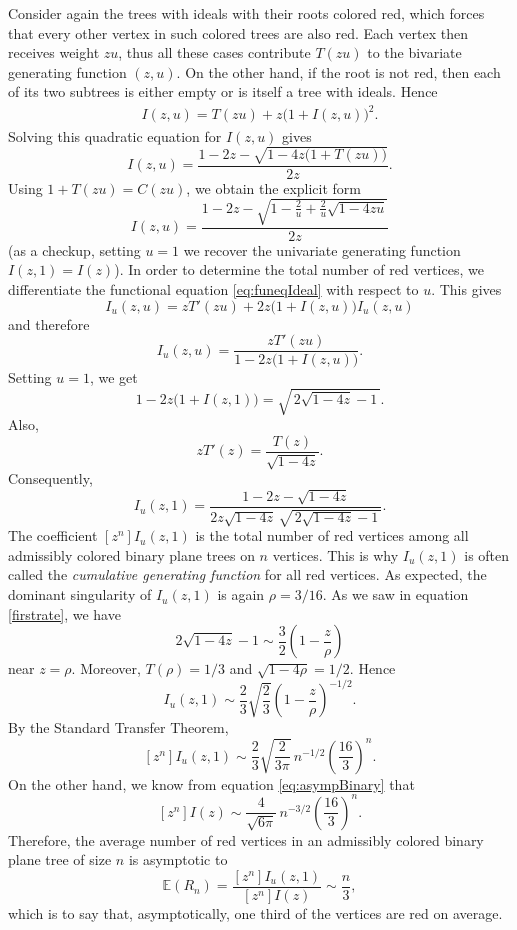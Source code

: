 \documentclass[11pt, onesided]{amsart}
\theoremstyle{remark}
\begin{document}
Consider again the trees with ideals with their roots colored red, which forces that every other vertex in such colored trees are also red. Each vertex then receives weight $zu$, thus all these cases contribute $T(zu)$ to the bivariate generating function $(z,u)$. On the other hand, if the root is not red, then each of its two subtrees is either empty or is itself a tree with ideals. 
%
Hence
\begin{align}
\label{eq:funeqIdeal}
I(z,u)=T(zu)+z\big(1+I(z,u)\big)^2.
\end{align}
Solving this quadratic equation for $I(z,u)$ gives \[ I(z,u) = \frac{ 1-2z-\sqrt{1-4z\big(1+T(zu)\big)} }{2z}. \] Using
$1+T(zu) = C(zu)$,
we obtain the explicit form
\[  I(z,u) = \frac{ 1-2z- \sqrt{ 1-\frac{2}{u}+\frac{2}{u}\sqrt{1-4zu} } }{2z}  \]
%
(as a checkup, setting $u=1$ we recover the univariate generating function
$I(z,1) =I(z)$).
In order to determine the total number of red vertices, we differentiate the functional equation \eqref{eq:funeqIdeal} with respect to $u$. This gives
\[
I_u(z,u) = zT'(zu) + 2z\big(1+I(z,u)\big)I_u(z,u)
\]
and therefore
 \[
 I_u(z,u) = \frac{zT'(zu)} {1-2z\big(1+I(z,u)\big)}.
 \]
 Setting $u=1$, we get \[ 1-2z\big(1+I(z,1)\big) = \sqrt{\,2\sqrt{1-4z}-1\,}.
 \] Also, \[ zT'(z) = \frac{T(z)}{\sqrt{1-4z}}. \] Consequently,
 \[
 	{ I_u(z,1) = \frac{ 1-2z-\sqrt{1-4z} }{ 2z\sqrt{1-4z}\, \sqrt{\,2\sqrt{1-4z}-1\,} }. }
\]
The coefficient $[z^n]I_u(z,1)$ is the total number of red vertices among all admissibly colored binary plane trees on $n$ vertices. This is why $I_u(z,1)$ is often called the {\em cumulative generating function} 
for all red vertices. 
As expected, the dominant singularity of $I_u(z,1)$ is again $\rho=3/16$. 
As we saw in equation \eqref{firstrate}, we have
\[
	2\sqrt{1-4z}-1 \sim \frac{3}{2}\left(1-\frac{z}{\rho}\right)
\]
near $z=\rho$.
Moreover, $T(\rho)=1/3$ and $\sqrt{1-4\rho}=1/2$. Hence
\[
	I_u(z,1) \sim \frac{2}{3}\sqrt{\frac23} \left(1-\frac{z}{\rho}\right)^{-1/2}.
\]
By the Standard Transfer Theorem,
\[
[z^n]I_u(z,1) \sim \frac{2}{3}\sqrt{\frac{2}{3\pi}}\, n^{-1/2} \left(\frac{16}{3}\right)^n.
\]
On the other hand, we know from equation \eqref{eq:asympBinary} that
\[ [z^n]I(z) \sim \frac{4}{\sqrt{6\pi}}\, n^{-3/2} \left(\frac{16}{3}\right)^n.
\]
Therefore, the average number of red vertices in an admissibly colored binary plane tree of size $n$ is asymptotic to
\[
\mathbb{E}(R_n) = \frac{ [z^n]I_u(z,1) }{ [z^n]I(z) } \sim \frac{n}{3},
\]
which is to say that, asymptotically, one third of the vertices are red on average.
\end{document}
